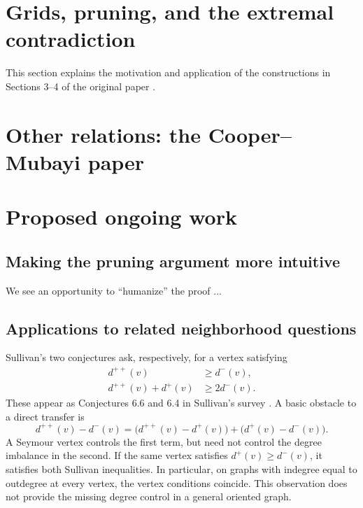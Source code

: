 \documentclass[11pt]{article}
\begin{document}
\clearpage
\section{Grids, pruning, and the extremal contradiction}
\label{sec:grid-pruning}

This section explains the motivation and application of the constructions
in Sections 3--4 of the original paper \cite{openai}. 

\section{Other relations: the Cooper--Mubayi paper}
\label{sec:other-relations}


\section{Proposed ongoing work}
\label{sec:ongoing}

\subsection{Making the pruning argument more intuitive}
We see an opportunity to ``humanize'' the proof ...

\subsection{Applications to related neighborhood questions}
Sullivan's two conjectures ask, respectively, for a vertex satisfying
\begin{align}
 d^{++}(v)&\ge d^-(v),\label{eq:sullivan-one}\\
 d^{++}(v)+d^+(v)&\ge2d^-(v).
 \label{eq:sullivan-two}
\end{align}
These appear as Conjectures 6.6 and 6.4 in Sullivan's survey
\cite{sullivan}. A basic obstacle to a direct transfer is
\begin{equation}
 d^{++}(v)-d^-(v)
 =\bigl(d^{++}(v)-d^+(v)\bigr)+\bigl(d^+(v)-d^-(v)\bigr).
 \label{eq:sullivan-obstruction}
\end{equation}
A Seymour vertex controls the first term, but need not control the
degree imbalance in the second. If the same vertex satisfies
$d^+(v)\ge d^-(v)$, it satisfies both Sullivan inequalities. In
particular, on graphs with indegree equal to outdegree at every
vertex, the vertex conditions coincide. This observation does not
provide the missing degree control in a general oriented graph.
\end{document}
